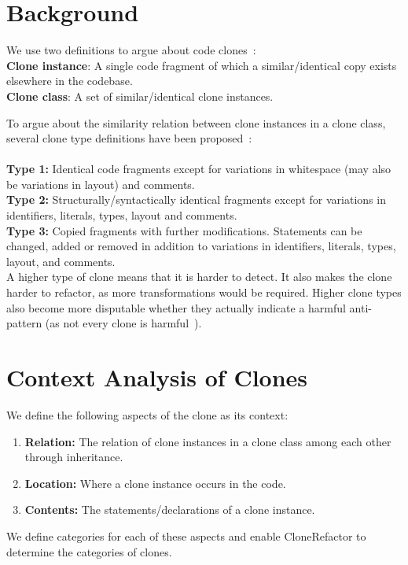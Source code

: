 \documentclass[runningheads]{llncs}
\begin{document}
\section{Background}
We use two definitions to argue about code clones~\cite{roy2007survey}:
\\ \textbf{Clone instance}: A single code fragment of which a similar/identical copy exists elsewhere in the codebase.
\\ \textbf{Clone class}: A set of similar/identical clone instances.

To argue about the similarity relation between clone instances in a clone class, several clone type definitions have been proposed~\cite{roy2007survey}:
\\\\
\textbf{Type 1:} Identical code fragments except for variations in whitespace (may also be variations in layout) and comments.\\
\textbf{Type 2:} Structurally/syntactically identical fragments except for variations in identifiers, literals, types, layout and comments.\\
\textbf{Type 3:} Copied fragments with further modifications. Statements can be changed, added or removed in addition to variations in identifiers, literals, types, layout, and comments.\\

A higher type of clone means that it is harder to detect. It also makes the clone harder to refactor, as more transformations would be required. Higher clone types also become more disputable whether they actually indicate a harmful anti-pattern (as not every clone is harmful~\cite{jarzabek2010clones, kapser2008cloning}).

\section{Context Analysis of Clones}\label{chap:contextsetup}
We define the following aspects of the clone as its context:
\begin{enumerate}
  \item \textbf{Relation:} The relation of clone instances in a clone class among each other through inheritance.
  \item \textbf{Location:} Where a clone instance occurs in the code.
  \item \textbf{Contents:} The statements/declarations of a clone instance.
\end{enumerate}
We define categories for each of these aspects and enable CloneRefactor to determine the categories of clones.
\end{document}
